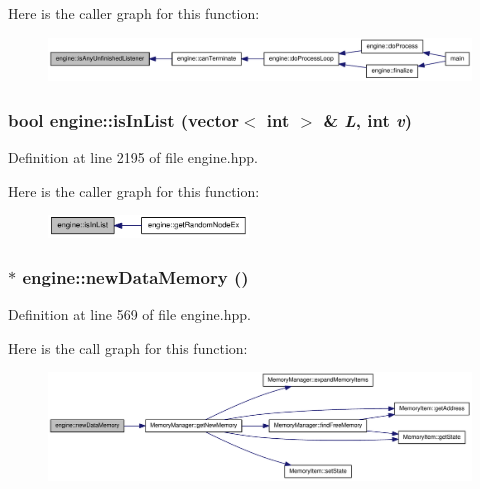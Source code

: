 Here is the caller graph for this function:\nopagebreak
\begin{figure}[H]
\begin{center}
\leavevmode
\includegraphics[width=356pt]{classengine_ab711383a9b6380efdc76eabc98f628de_icgraph}
\end{center}
\end{figure}
\hypertarget{classengine_a8ddaa23b1b3357279a2e932d0603d547}{
\subsubsection[{isInList}]{\setlength{\rightskip}{0pt plus 5cm}bool engine::isInList (vector$<$ int $>$ \& {\em L}, \/  int {\em v})}}
\label{classengine_a8ddaa23b1b3357279a2e932d0603d547}


Definition at line 2195 of file engine.hpp.

Here is the caller graph for this function:\nopagebreak
\begin{figure}[H]
\begin{center}
\leavevmode
\includegraphics[width=151pt]{classengine_a8ddaa23b1b3357279a2e932d0603d547_icgraph}
\end{center}
\end{figure}
\hypertarget{classengine_a99ae6156ee65044d03d61a3776ef2f99}{
\subsubsection[{newDataMemory}]{$\ast$ engine::newDataMemory ()}}
\label{classengine_a99ae6156ee65044d03d61a3776ef2f99}


Definition at line 569 of file engine.hpp.

Here is the call graph for this function:\nopagebreak
\begin{figure}[H]
\begin{center}
\leavevmode
\includegraphics[width=379pt]{classengine_a99ae6156ee65044d03d61a3776ef2f99_cgraph}
\end{center}
\end{figure}


